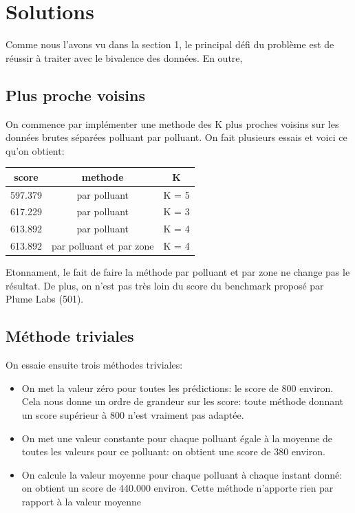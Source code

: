 \section{Solutions}

Comme nous l'avons vu dans la section 1, le principal défi du problème est de réussir à traiter avec le bivalence des données. En outre, 

\subsection{Plus proche voisins}

On commence par implémenter une methode des K plus proches voisins sur les données brutes séparées polluant par polluant.
On fait plusieurs essais et voici ce qu'on obtient:

\begin{center}

\begin{tabular}{|c|c|c|}
  \hline
  score & methode & K \\
  \hline
  597.379 &  par polluant & K = 5\\
  \hline
  617.229 & par polluant & K = 3\\
  \hline
  613.892 & par polluant  & K = 4\\
  \hline
  613.892 & par polluant et par zone & K = 4\\
  \hline
\end{tabular}
	\end{center}
Etonnament, le fait de faire la méthode par polluant et par zone ne change pas le résultat.
De plus, on n'est pas très loin du score du benchmark proposé par Plume Labs (501).

\subsection{Méthode triviales}

On essaie ensuite trois méthodes triviales:
\begin{itemize}
  \item
    On met la valeur zéro pour toutes les prédictions: le score de 800 environ.
    Cela nous donne un ordre de grandeur sur les score: toute méthode donnant un score supérieur à 800 n'est vraiment pas adaptée.
  \item
    On met une valeur constante pour chaque polluant égale à la moyenne de toutes les valeurs pour ce polluant: on obtient une score de 380 environ.
  \item
    On calcule la valeur moyenne pour chaque polluant à chaque instant donné: on obtient un score de 440.000 environ.
    Cette méthode n'apporte rien par rapport à la valeur moyenne %
\end{itemize}

